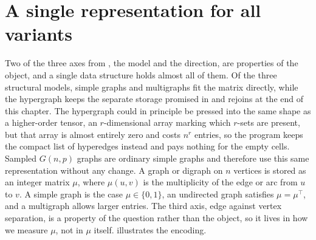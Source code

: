 \section{A single representation for all variants}
Two of the three axes from , the model and the direction, are properties of the object, and a single data structure holds almost all of them. Of the three structural models, simple graphs and multigraphs fit the matrix directly, while the hypergraph keeps the separate storage promised in  and rejoins at the end of this chapter. The hypergraph could in principle be pressed into the same shape as a higher-order tensor, an $r$-dimensional array marking which $r$-sets are present, but that array is almost entirely zero and costs $n^r$ entries, so the program keeps the compact list of hyperedges instead and pays nothing for the empty cells. Sampled $G(n,p)$ graphs are ordinary simple graphs and therefore use this same representation without any change. A graph or digraph on $n$ vertices is stored as an integer matrix $\mu$, where $\mu(u, v)$ is the multiplicity of the edge or arc from $u$ to $v$. A simple graph is the case $\mu \in \{0, 1\}$, an undirected graph satisfies $\mu = \mu^{\top}$, and a multigraph allows larger entries. The third axis, edge against vertex separation, is a property of the question rather than the object, so it lives in how we measure $\mu$, not in $\mu$ itself.  illustrates the encoding.


